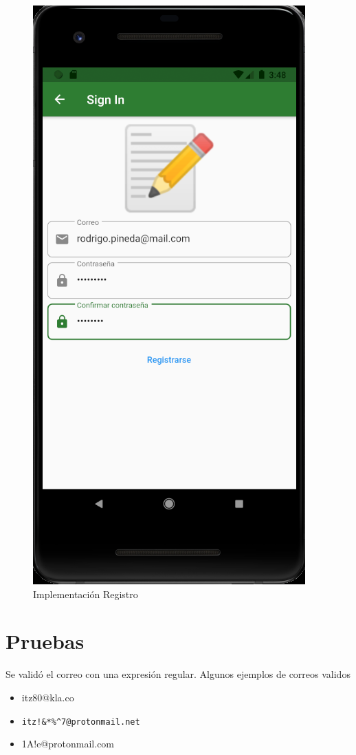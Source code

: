 \documentclass{article}
\begin{document}
\begin{figure}[H]
    \centering
    \includegraphics[scale=0.8]{imgs/Imp/Registro}
    \caption{Implementación Registro}
\end{figure}
\section{Pruebas}%
Se validó el correo con una expresión regular. Algunos ejemplos de correos validos
\begin{itemize}
	\item itz80@kla.co
	\item \verb |itz!&*%
	\item 1A!e@protonmail.com
\end{itemize}

\pagebreak
\printbibliography
\end{document}
